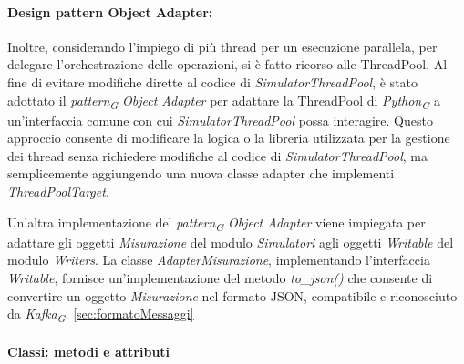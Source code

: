 \begin{itemize}
\paragraph{Design pattern Object Adapter:}
Inoltre, considerando l'impiego di più thread per un esecuzione parallela, per delegare l'orchestrazione delle operazioni, si è fatto ricorso alle ThreadPool. Al fine di evitare modifiche dirette al codice di \textit{SimulatorThreadPool}, è stato adottato il \textit{pattern}\textsubscript{\textit{G}} \textit{Object Adapter} per adattare la ThreadPool di \textit{Python}\textsubscript{\textit{G}} a un'interfaccia comune con cui \textit{SimulatorThreadPool} possa interagire. Questo approccio consente di modificare la logica o la libreria utilizzata per la gestione dei thread senza richiedere modifiche al codice di \textit{SimulatorThreadPool}, ma semplicemente aggiungendo una nuova classe adapter che implementi \textit{ThreadPoolTarget}.


Un'altra implementazione del \textit{pattern}\textsubscript{\textit{G}} \textit{Object Adapter} viene impiegata per adattare gli oggetti \textit{Misurazione} del modulo \textit{Simulatori} agli oggetti \textit{Writable} del modulo \textit{Writers}. La classe \textit{AdapterMisurazione}, implementando l'interfaccia \textit{Writable}, fornisce un'implementazione del metodo \textit{to\_json()} che consente di convertire un oggetto \textit{Misurazione} nel formato JSON, compatibile e riconosciuto da \textit{Kafka}\textsubscript{\textit{G}}.
\ref*{sec:formatoMessaggi}


\paragraph{Classi: metodi e attributi}


\end{itemize}
